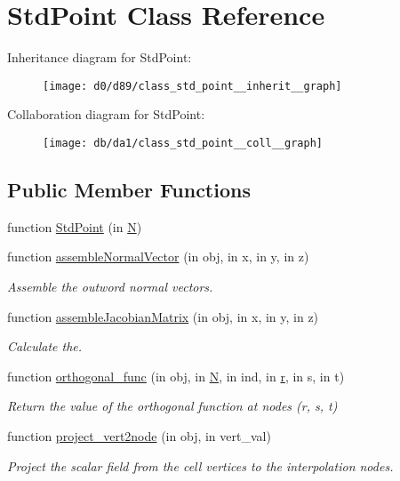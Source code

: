 \hypertarget{class_std_point}{}\section{Std\+Point Class Reference}
\label{class_std_point}


Inheritance diagram for Std\+Point\+:
\nopagebreak
\begin{figure}[H]
\begin{center}
\leavevmode
\texttt{[image: d0/d89/class\_std\_point\_\_inherit\_\_graph]}
\end{center}
\end{figure}


Collaboration diagram for Std\+Point\+:
\nopagebreak
\begin{figure}[H]
\begin{center}
\leavevmode
\texttt{[image: db/da1/class\_std\_point\_\_coll\_\_graph]}
\end{center}
\end{figure}
\subsection*{Public Member Functions}
\begin{DoxyCompactItemize}
\item 
function \hyperlink{class_std_point_a2f3716300385b3cce7cb56b50433fd0e}{Std\+Point} (in \hyperlink{class_std_cell_a8df35ad5169af36d3dff62644f7878c9}{N})
\item 
function \hyperlink{class_std_point_a36712fdbd91668db237fa95143805686}{assemble\+Normal\+Vector} (in obj, in x, in y, in z)
\begin{DoxyCompactList}\small\item\em Assemble the outword normal vectors. \end{DoxyCompactList}\item 
function \hyperlink{class_std_point_a8dc82782091fd556e25f5843f8115580}{assemble\+Jacobian\+Matrix} (in obj, in x, in y, in z)
\begin{DoxyCompactList}\small\item\em Calculate the. \end{DoxyCompactList}\item 
function \hyperlink{class_std_point_a38e1541f9b64b912c8acc385cbf10ca1}{orthogonal\+\_\+func} (in obj, in \hyperlink{class_std_cell_a8df35ad5169af36d3dff62644f7878c9}{N}, in ind, in \hyperlink{class_std_cell_a737dd2feb25f74be0215a594334ec622}{r}, in s, in t)
\begin{DoxyCompactList}\small\item\em Return the value of the orthogonal function at nodes (r, s, t) \end{DoxyCompactList}\item 
function \hyperlink{class_std_point_ab68712fb0048104f3722f121ed81c1f0}{project\+\_\+vert2node} (in obj, in vert\+\_\+val)
\begin{DoxyCompactList}\small\item\em Project the scalar field from the cell vertices to the interpolation nodes. \end{DoxyCompactList}\end{DoxyCompactItemize}
